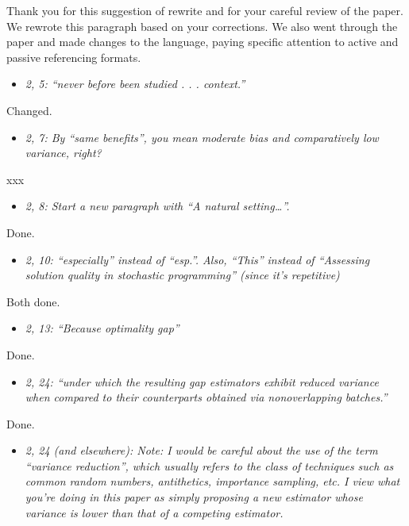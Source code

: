 \documentclass[11pt,notitlepage,onecolumn]{article}
\newcommand{\noi}{\noindent}
\begin{document}
\noi
Thank you for this suggestion of rewrite and for your careful review of the paper. 
We rewrote this paragraph based on your corrections.
We also went through the paper and made changes to the language, paying specific attention to active and passive referencing formats. 
\medskip 


\begin{itemize}
\item[] \textit{2, 5: ``never before been studied . . . context.''}
\end{itemize}

\noi
Changed.
\medskip 


\begin{itemize}
\item[] \textit{2, 7: By ``same benefits'', you mean moderate bias and comparatively low variance, right?}
\end{itemize}

\noi
xxx  
\medskip 


\begin{itemize}
\item[] \textit{2, 8: Start a new paragraph with ``A natural setting\ldots ''.}
\end{itemize}

\noi
Done.
\medskip 


\begin{itemize}
\item[] \textit{2, 10: ``especially'' instead of ``esp.''. 
Also, ``This'' instead of ``Assessing solution quality in stochastic programming'' (since it's repetitive)}
\end{itemize}

\noi
Both done.  
\medskip 


\begin{itemize}
\item[] \textit{2, 13: ``Because optimality gap''}
\end{itemize}

\noi
Done.
\medskip 


\begin{itemize}
\item[] \textit{2, 24: ``under which the resulting gap estimators exhibit reduced variance when compared to their counterparts obtained via nonoverlapping batches.''}
\end{itemize}

\noi
Done.
\medskip 


\begin{itemize}
\item[] \textit{2, 24 (and elsewhere): Note: I would be careful about the use of the term ``variance reduction'', which usually refers to the class of techniques such as common random numbers, antithetics, importance sampling, etc. 
I view what you're doing in this paper as simply proposing a new estimator whose variance is lower than that of a competing estimator.}
\end{itemize}
\end{document}
